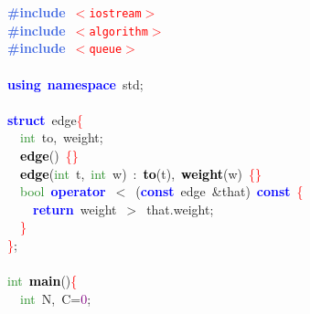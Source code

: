 
{\ttfamily \raggedright {
\noindent
\mbox{}\textbf{\textcolor{RoyalBlue}{\#include}}\ \texttt{\textcolor{Red}{$<$iostream$>$}} \\
\mbox{}\textbf{\textcolor{RoyalBlue}{\#include}}\ \texttt{\textcolor{Red}{$<$algorithm$>$}} \\
\mbox{}\textbf{\textcolor{RoyalBlue}{\#include}}\ \texttt{\textcolor{Red}{$<$queue$>$}} \\
\mbox{} \\
\mbox{}\textbf{\textcolor{Blue}{using}}\ \textbf{\textcolor{Blue}{namespace}}\ std\textcolor{BrickRed}{;} \\
\mbox{} \\
\mbox{}\textbf{\textcolor{Blue}{struct}}\ edge\textcolor{Red}{\{} \\
\mbox{}\ \ \textcolor{ForestGreen}{int}\ to\textcolor{BrickRed}{,}\ weight\textcolor{BrickRed}{;} \\
\mbox{}\ \ \textbf{\textcolor{Black}{edge}}\textcolor{BrickRed}{()}\ \textcolor{Red}{\{\}} \\
\mbox{}\ \ \textbf{\textcolor{Black}{edge}}\textcolor{BrickRed}{(}\textcolor{ForestGreen}{int}\ t\textcolor{BrickRed}{,}\ \textcolor{ForestGreen}{int}\ w\textcolor{BrickRed}{)}\ \textcolor{BrickRed}{:}\ \textbf{\textcolor{Black}{to}}\textcolor{BrickRed}{(}t\textcolor{BrickRed}{),}\ \textbf{\textcolor{Black}{weight}}\textcolor{BrickRed}{(}w\textcolor{BrickRed}{)}\ \textcolor{Red}{\{\}} \\
\mbox{}\ \ \textcolor{ForestGreen}{bool}\ \textbf{\textcolor{Blue}{operator}}\ \textcolor{BrickRed}{$<$}\ \textcolor{BrickRed}{(}\textbf{\textcolor{Blue}{const}}\ edge\ \textcolor{BrickRed}{\&}that\textcolor{BrickRed}{)}\ \textbf{\textcolor{Blue}{const}}\ \textcolor{Red}{\{} \\
\mbox{}\ \ \ \ \textbf{\textcolor{Blue}{return}}\ weight\ \textcolor{BrickRed}{$>$}\ that\textcolor{BrickRed}{.}weight\textcolor{BrickRed}{;} \\
\mbox{}\ \ \textcolor{Red}{\}} \\
\mbox{}\textcolor{Red}{\}}\textcolor{BrickRed}{;} \\
\mbox{} \\
\mbox{}\textcolor{ForestGreen}{int}\ \textbf{\textcolor{Black}{main}}\textcolor{BrickRed}{()}\textcolor{Red}{\{} \\
\mbox{}\ \ \textcolor{ForestGreen}{int}\ N\textcolor{BrickRed}{,}\ C\textcolor{BrickRed}{=}\textcolor{Purple}{0}\textcolor{BrickRed}{;} \\
}}
